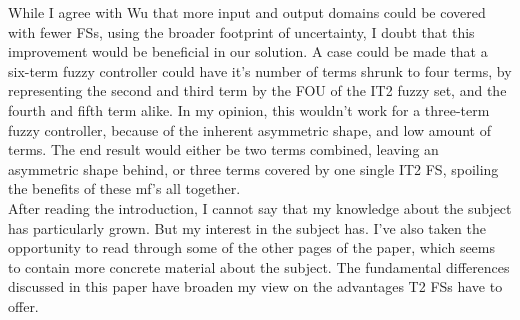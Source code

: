 While I agree with Wu that more input and output domains could be covered with fewer FSs, using the broader footprint of uncertainty, I doubt that this improvement would be beneficial in our solution. A case could be made that a six-term fuzzy controller could have it's number of terms shrunk to four terms, by representing the second and third term by the FOU of the IT2 fuzzy set, and the fourth and fifth term alike. In my opinion, this wouldn't work for a three-term fuzzy controller, because of the inherent asymmetric shape, and low amount of terms. The end result would either be two terms combined, leaving an asymmetric shape behind, or three terms covered by one single IT2 FS, spoiling the benefits of these mf's all together. \\

After reading the introduction, I cannot say that my knowledge about the subject has particularly grown. But my interest in the subject has. I've also taken the opportunity to read through some of the other pages of the paper, which seems to contain more concrete material about the subject.
The fundamental differences discussed in this paper have broaden my view on the advantages T2 FSs have to offer.
